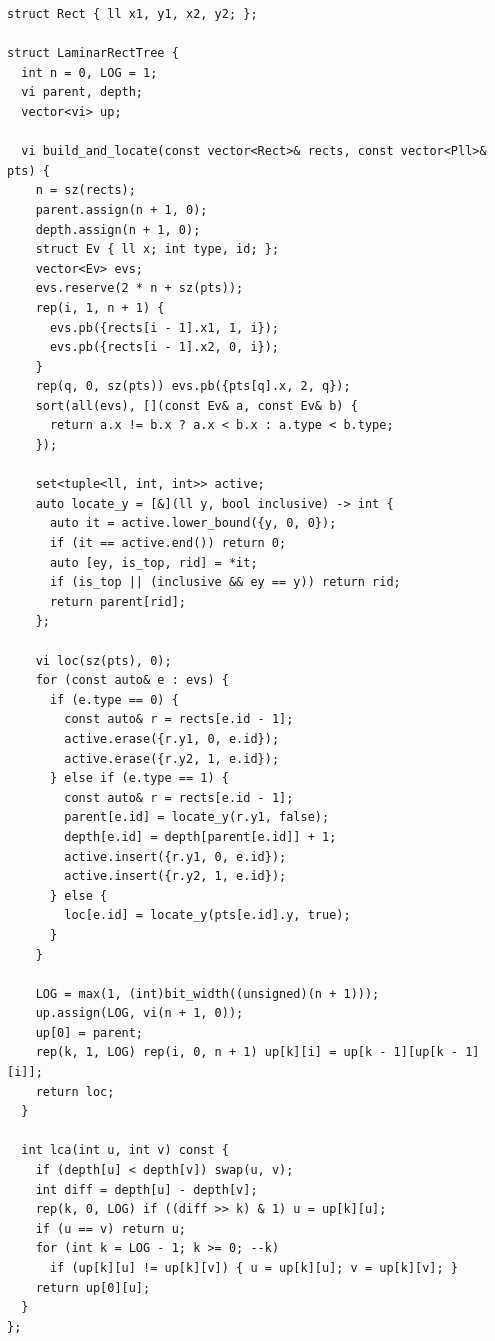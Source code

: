 \begin{lstlisting}
struct Rect { ll x1, y1, x2, y2; };

struct LaminarRectTree {
  int n = 0, LOG = 1;
  vi parent, depth;
  vector<vi> up;

  vi build_and_locate(const vector<Rect>& rects, const vector<Pll>& pts) {
    n = sz(rects);
    parent.assign(n + 1, 0);
    depth.assign(n + 1, 0);
    struct Ev { ll x; int type, id; };
    vector<Ev> evs;
    evs.reserve(2 * n + sz(pts));
    rep(i, 1, n + 1) {
      evs.pb({rects[i - 1].x1, 1, i});
      evs.pb({rects[i - 1].x2, 0, i});
    }
    rep(q, 0, sz(pts)) evs.pb({pts[q].x, 2, q});
    sort(all(evs), [](const Ev& a, const Ev& b) {
      return a.x != b.x ? a.x < b.x : a.type < b.type;
    });

    set<tuple<ll, int, int>> active;
    auto locate_y = [&](ll y, bool inclusive) -> int {
      auto it = active.lower_bound({y, 0, 0});
      if (it == active.end()) return 0;
      auto [ey, is_top, rid] = *it;
      if (is_top || (inclusive && ey == y)) return rid;
      return parent[rid];
    };

    vi loc(sz(pts), 0);
    for (const auto& e : evs) {
      if (e.type == 0) {
        const auto& r = rects[e.id - 1];
        active.erase({r.y1, 0, e.id});
        active.erase({r.y2, 1, e.id});
      } else if (e.type == 1) {
        const auto& r = rects[e.id - 1];
        parent[e.id] = locate_y(r.y1, false);
        depth[e.id] = depth[parent[e.id]] + 1;
        active.insert({r.y1, 0, e.id});
        active.insert({r.y2, 1, e.id});
      } else {
        loc[e.id] = locate_y(pts[e.id].y, true);
      }
    }

    LOG = max(1, (int)bit_width((unsigned)(n + 1)));
    up.assign(LOG, vi(n + 1, 0));
    up[0] = parent;
    rep(k, 1, LOG) rep(i, 0, n + 1) up[k][i] = up[k - 1][up[k - 1][i]];
    return loc;
  }

  int lca(int u, int v) const {
    if (depth[u] < depth[v]) swap(u, v);
    int diff = depth[u] - depth[v];
    rep(k, 0, LOG) if ((diff >> k) & 1) u = up[k][u];
    if (u == v) return u;
    for (int k = LOG - 1; k >= 0; --k)
      if (up[k][u] != up[k][v]) { u = up[k][u]; v = up[k][v]; }
    return up[0][u];
  }
};
\end{lstlisting}

